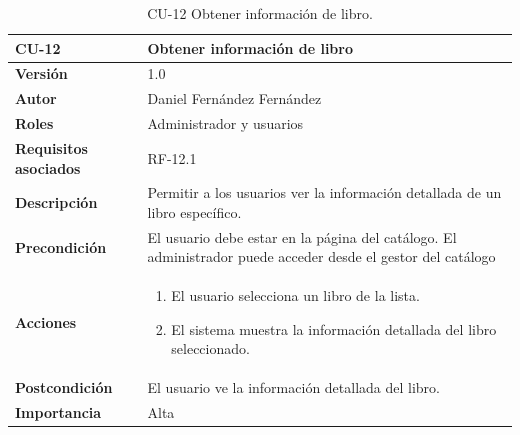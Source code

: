 \begin{table}[p]
        \centering
        \begin{tabularx}{\linewidth}{ p{} p{} }
            \toprule
            \textbf{CU-12} & \textbf{Obtener información de libro}\\
            \toprule
            \textbf{Versión} & 1.0 \\
            \textbf{Autor} & Daniel Fernández Fernández \\
            \textbf{Roles} & Administrador y usuarios \\
            \textbf{Requisitos asociados} & RF-12.1 \\
            \textbf{Descripción} & Permitir a los usuarios ver la información detallada de un libro específico. \\
            \textbf{Precondición} & El usuario debe estar en la página del catálogo. El administrador puede acceder desde el gestor del catálogo \\
            \textbf{Acciones} &
            \begin{enumerate}
            \def\labelenumi{\arabic{enumi}.}
            \tightlist
            \item El usuario selecciona un libro de la lista.
            \item El sistema muestra la información detallada del libro seleccionado.
            \end{enumerate}\\
            \textbf{Postcondición} & El usuario ve la información detallada del libro. \\
            \textbf{Importancia} & Alta \\
            \bottomrule
        \end{tabularx}
        \caption{CU-12 Obtener información de libro.}
\end{table}



